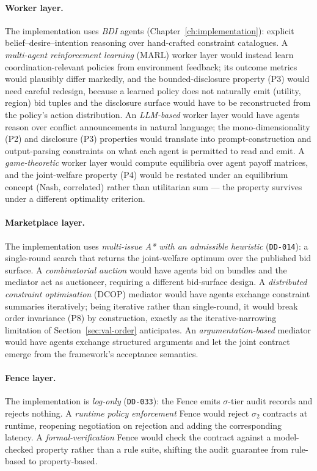 \paragraph{Worker layer.}
The implementation uses \emph{BDI} agents
(Chapter~\ref{ch:implementation}): explicit belief--desire--intention
reasoning over hand-crafted constraint catalogues. A
\emph{multi-agent reinforcement learning} (MARL) worker layer would
instead learn coordination-relevant policies from environment
feedback; its outcome metrics would plausibly differ markedly, and
the bounded-disclosure property (P3) would need careful redesign,
because a learned policy does not naturally emit
(utility, region) bid tuples and the disclosure surface would have to
be reconstructed from the policy's action distribution. An
\emph{LLM-based} worker layer would have agents reason over conflict
announcements in natural language; the mono-dimensionality (P2) and
disclosure (P3) properties would translate into prompt-construction
and output-parsing constraints on what each agent is permitted to
read and emit. A \emph{game-theoretic} worker layer would compute
equilibria over agent payoff matrices, and the joint-welfare property
(P4) would be restated under an equilibrium concept (Nash, correlated)
rather than utilitarian sum --- the property survives under a
different optimality criterion.

\paragraph{Marketplace layer.}
The implementation uses \emph{multi-issue A* with an admissible
heuristic} (\texttt{DD-014}): a single-round search that returns the
joint-welfare optimum over the published bid surface. A
\emph{combinatorial auction} would have agents bid on bundles and the
mediator act as auctioneer, requiring a different bid-surface design.
A \emph{distributed constraint optimisation} (DCOP) mediator would
have agents exchange constraint summaries iteratively; being
iterative rather than single-round, it would break order invariance
(P8) by construction, exactly as the iterative-narrowing limitation
of Section~\ref{sec:val-order} anticipates. An
\emph{argumentation-based} mediator would have agents exchange
structured arguments and let the joint contract emerge from the
framework's acceptance semantics.

\paragraph{Fence layer.}
The implementation is \emph{log-only} (\texttt{DD-033}): the Fence
emits $\sigma$-tier audit records and rejects nothing. A
\emph{runtime policy enforcement} Fence would reject $\sigma_2$
contracts at runtime, reopening negotiation on rejection and adding
the corresponding latency. A \emph{formal-verification} Fence would
check the contract against a model-checked property rather than a
rule suite, shifting the audit guarantee from rule-based to
property-based.


